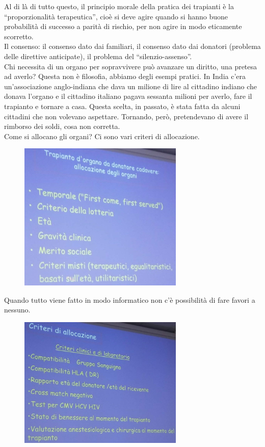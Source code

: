 Al di là di tutto questo, il principio morale della pratica dei
trapianti è la ``proporzionalità terapeutica'', cioè si deve agire
quando si hanno buone probabilità di successo a parità di rischio, per
non agire in modo eticamente scorretto.
\\
Il consenso: il consenso dato dai familiari, il consenso dato dai
donatori (problema delle direttive anticipate), il problema del
``silenzio-assenso''.
\\
Chi necessita di un organo per sopravvivere può avanzare un diritto, una
pretesa ad averlo? Questa non è filosofia, abbiamo degli esempi pratici.
In India c'era un'associazione anglo-indiana che dava un milione di lire
al cittadino indiano che donava l'organo e il cittadino italiano pagava
sessanta milioni per averlo, fare il trapianto e tornare a casa. Questa
scelta, in passato, è stata fatta da alcuni cittadini che non volevano
aspettare. Tornando, però, pretendevano di avere il rimborso dei soldi,
cosa non corretta.
\\
Come si allocano gli organi? Ci sono vari criteri di allocazione.
\begin{figure}[!ht]
\centering
	\includegraphics[width=0.7\textwidth]{34/image15.jpeg}
	\end{figure}

Quando tutto viene fatto in modo informatico non c'è possibilità di fare
favori a nessuno.
\begin{figure}[!ht]
\centering
	\includegraphics[width=0.7\textwidth]{34/image16.jpeg}
	\end{figure}


